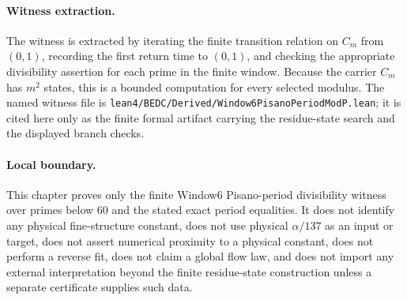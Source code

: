\paragraph{Witness extraction.}
The witness is extracted by iterating the finite transition relation on $C_m$ from $(0,1)$, recording the first return time to $(0,1)$, and checking the appropriate divisibility assertion for each prime in the finite window. Because the carrier $C_m$ has $m^2$ states, this is a bounded computation for every selected modulus. The named witness file is \texttt{lean4/BEDC/Derived/Window6PisanoPeriodModP.lean}; it is cited here only as the finite formal artifact carrying the residue-state search and the displayed branch checks.

\paragraph{Local boundary.}
This chapter proves only the finite Window6 Pisano-period divisibility witness over primes below $60$ and the stated exact period equalities. It does not identify any physical fine-structure constant, does not use physical $\alpha/137$ as an input or target, does not assert numerical proximity to a physical constant, does not perform a reverse fit, does not claim a global flow law, and does not import any external interpretation beyond the finite residue-state construction unless a separate certificate supplies such data.

